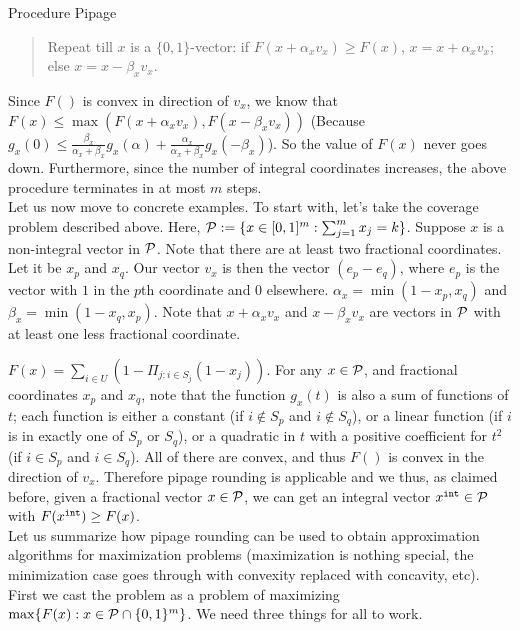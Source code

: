 \documentclass[11pt]{article}
\begin{document}
\noindent
Procedure {\sc Pipage} 
\begin{quote}
Repeat till $x$ is a $\{0,1\}$-vector: if $F(x+\alpha_x v_x) \ge F(x)$, $x = x+\alpha_x v_x$; else 
	$x = x - \beta_xv_x$. 
\end{quote}
\vspace{2ex}
\noindent
Since $F()$ is convex in direction of $v_x$, we know that $F(x) \le \max\left(F(x+\alpha_xv_x), F(x - \beta_xv_x)\right)$  (Because $g_x(0) \le \frac{\beta_x}{\alpha_x + \beta_x}g_x(\alpha) + \frac{\alpha_x}{\alpha_x + \beta_x}g_x(-\beta_x)$). So the value of $F(x)$ never goes down. Furthermore, since the number of integral coordinates increases, the above procedure terminates in at most $m$ steps. \\

Let us now move to concrete examples. To start with, let's take the coverage problem described above. Here, 
$\P := \{x\in [0,1]^m: \sum_{j=1}^m x_j = k\}$. Suppose $x$ is a non-integral vector in $\P$. Note that there are at least two fractional coordinates. Let it be $x_p$ and $x_q$. Our vector $v_x$ is then the vector $(e_p - e_q)$, where $e_p$ is the vector with $1$ in the $p$th coordinate and $0$ elsewhere. $\alpha_x = \min(1-x_p,x_q)$ and $\beta_x = \min(1-x_q,x_p)$. Note that $x + \alpha_xv_x$ and $x - \beta_xv_x$ are vectors in $\P$ with at least one less fractional coordinate.  

\indent
$F(x) = \sum_{i\in U}\left(1 - \Pi_{j: i\in S_j} (1 - x_j) \right)$. For any $x\in \P$, and fractional coordinates $x_p$ and $x_q$, note that the function $g_x(t)$ is also a sum of functions of $t$; each function is either a constant 
(if $i\notin S_p$ and $i\notin S_q$), or a linear function (if $i$ is in exactly one of $S_p$ or $S_q$), or a quadratic in $t$ with a positive coefficient for $t^2$ (if $i\in S_p$ and $i\in S_q$). All of there are convex, and thus $F()$ is convex in the direction of $v_x$. Therefore pipage rounding is applicable and we thus, as claimed before, given a fractional vector $x\in \P$, we can get an integral vector $\xint\in \P$ with 
$F(\xint) \ge F(x)$. \\

\noindent 
Let us summarize how pipage rounding can be used to obtain approximation algorithms for maximization problems (maximization is nothing special, the minimization case goes through with convexity replaced with concavity, etc). First we cast the problem as a problem of maximizing $\max \{F(x): x\in \P\cap \{0,1\}^m\}$. 
We need three things for all to work.
\end{document}
